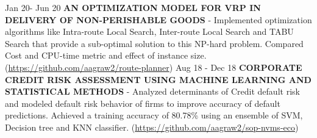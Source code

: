 \begin{cvskills}
  \cvskill
    {Jan 20- Jun 20}
    {\textbf{AN OPTIMIZATION MODEL FOR VRP IN DELIVERY OF NON-PERISHABLE GOODS} - Implemented optimization algorithms like Intra-route Local Search, Inter-route Local Search and TABU Search that provide a sub-optimal solution to this NP-hard problem. Compared Cost and CPU-time metric and effect of instance size. (\url{https://github.com/aagraw2/route-planner})}
  \cvskill
    {Aug 18 - Dec 18}
    {\textbf{CORPORATE CREDIT RISK ASSESSMENT USING MACHINE LEARNING AND STATISTICAL METHODS} - Analyzed determinants of Credit default risk and modeled default risk behavior of firms to improve accuracy of default predictions. Achieved a training accuracy of 80.78\% using an ensemble of SVM, Decision tree and KNN classifier. (\url{https://github.com/aagraw2/sop-nvms-eco})}
\end{cvskills}  